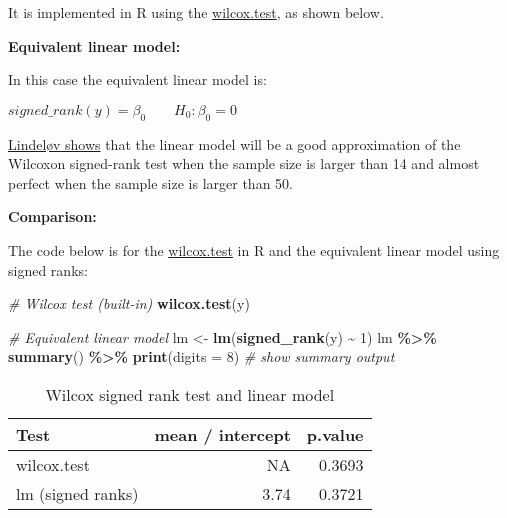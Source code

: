 \documentclass[
  12pt,
]{krantz}
\newenvironment{Shaded}{\begin{snugshade}}{\end{snugshade}}
\newcommand{\CommentTok}[1]{\textcolor[rgb]{0.56,0.35,0.01}{\textit{#1}}}
\newcommand{\DataTypeTok}[1]{\textcolor[rgb]{0.13,0.29,0.53}{#1}}
\newcommand{\DecValTok}[1]{\textcolor[rgb]{0.00,0.00,0.81}{#1}}
\newcommand{\KeywordTok}[1]{\textcolor[rgb]{0.13,0.29,0.53}{\textbf{#1}}}
\newcommand{\NormalTok}[1]{#1}
\newcommand{\OperatorTok}[1]{\textcolor[rgb]{0.81,0.36,0.00}{\textbf{#1}}}
\newcommand{\StringTok}[1]{\textcolor[rgb]{0.31,0.60,0.02}{#1}}
\begin{document}
It is implemented in R using the \href{https://www.rdocumentation.org/packages/stats/versions/3.5.3/topics/wilcox.test}{wilcox.test}, as shown below.

\textbf{Equivalent linear model:}

In this case the equivalent linear model is:

\begin{center}

\(signed\_rank(y) = \beta_0 \qquad H_0: \beta_0 = 0\)

\end{center}

\href{https://lindeloev.github.io/tests-as-linear/simulations/simulate_wilcoxon.html}{Lindeløv shows} that the linear model will be a good approximation of the Wilcoxon signed-rank test when the sample size is larger than 14 and almost perfect when the sample size is larger than 50.

\textbf{Comparison:}

The code below is for the \href{https://www.rdocumentation.org/packages/stats/versions/3.5.3/topics/wilcox.test}{wilcox.test} in R and the equivalent linear model using signed ranks:

\begin{Shaded}
\begin{Highlighting}[]
\CommentTok{\# Wilcox test (built{-}in)}
\KeywordTok{wilcox.test}\NormalTok{(y)}

\CommentTok{\# Equivalent linear model}
\NormalTok{lm \textless{}{-}}\StringTok{ }\KeywordTok{lm}\NormalTok{(}\KeywordTok{signed\_rank}\NormalTok{(y) }\OperatorTok{\textasciitilde{}}\StringTok{ }\DecValTok{1}\NormalTok{)}
\NormalTok{  lm }\OperatorTok{\%\textgreater{}\%}\StringTok{ }\KeywordTok{summary}\NormalTok{() }\OperatorTok{\%\textgreater{}\%}\StringTok{ }\KeywordTok{print}\NormalTok{(}\DataTypeTok{digits =} \DecValTok{8}\NormalTok{) }\CommentTok{\# show summary output}
\end{Highlighting}
\end{Shaded}

\begin{table}

\caption{\label{tab:unnamed-chunk-23}Wilcox signed rank test and linear model}
\centering
\begin{tabular}[t]{lrr}
\toprule
Test & mean / intercept & p.value\\
\midrule
wilcox.test & NA & 0.3693\\
lm (signed ranks) & 3.74 & 0.3721\\
\bottomrule
\end{tabular}
\end{table}
\end{document}
